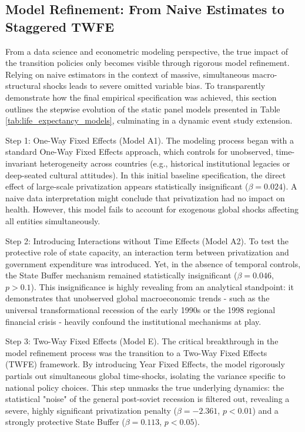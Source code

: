 \documentclass[en,magisterska]{pracamgr}
\begin{document}
\subsection{Model Refinement: From Naive Estimates to Staggered TWFE}

From a data science and econometric modeling perspective, the true impact of the transition policies only becomes visible through rigorous model refinement. 
Relying on naive estimators in the context of massive, simultaneous macro-structural shocks leads to severe omitted variable bias. To transparently demonstrate 
how the final empirical specification was achieved, this section outlines the stepwise evolution of the static panel models presented in Table 
\ref{tab:life_expectancy_models}, culminating in a dynamic event study extension.

Step 1: One-Way Fixed Effects (Model A1). The modeling process began with a standard One-Way Fixed Effects approach, which controls for unobserved, time-invariant 
heterogeneity across countries (e.g., historical institutional legacies or deep-seated cultural attitudes). In this initial baseline specification, the direct effect 
of large-scale privatization appears statistically insignificant ($\beta=0.024$). A naive data interpretation might conclude that privatization had no impact on health. 
However, this model fails to account for exogenous global shocks affecting all entities simultaneously.

Step 2: Introducing Interactions without Time Effects (Model A2). To test the protective role of state capacity, an interaction term between privatization and government 
expenditure was introduced. Yet, in the absence of temporal controls, the State Buffer mechanism remained statistically insignificant ($\beta=0.046$, $p>0.1$). This insignificance 
is highly revealing from an analytical standpoint: it demonstrates that unobserved global macroeconomic trends  -  such as the universal transformational recession of the early 
1990s or the 1998 regional financial crisis \citep{EBRD1999}  -  heavily confound the institutional mechanisms at play.

Step 3: Two-Way Fixed Effects (Model E). The critical breakthrough in the model refinement process was the transition to a Two-Way Fixed Effects (TWFE) framework. By introducing 
Year Fixed Effects, the model rigorously partials out simultaneous global time-shocks, isolating the variance specific to national policy choices. This step unmasks the true underlying 
dynamics: the statistical "noise" of the general post-soviet recession is filtered out, revealing a severe, highly significant privatization penalty ($\beta = -2.361$, $p < 0.01$) and a 
strongly protective State Buffer ($\beta = 0.113$, $p < 0.05$).
\end{document}
